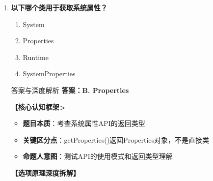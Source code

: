 \documentclass[12pt, a4paper]{ctexart}
\begin{document}
\begin{enumerate}[label=\textbf{\arabic*.}]
\begin{bluebox}{答案与深度解析}
		      \textbf{考场秒杀}：看到"不能实现接口"→选错误（枚举可以）
		      \textbf{高频陷阱}：
		      \begin{itemize}[label={}, nosep]
			      \item 枚举能实现接口，但不能继承类
			      \item 枚举构造器必须是private
			      \item 枚举实例是单例常量
		      \end{itemize}
		      \textbf{记忆口诀}：枚举就像类，能接口不能承，构造器必私有，成员是常量
	      \end{bluebox}

	      \vspace{1em}

	\item \textbf{以下哪个类用于获取系统属性？}
	      \begin{enumerate}[label=\Alph*.]
		      \item System
		      \item Properties
		      \item Runtime
		      \item SystemProperties
	      \end{enumerate}

	      \begin{bluebox}{答案与深度解析}
		      \textbf{答案：B. Properties}

		      \textbf{【核心认知框架>}
		      \begin{itemize}[label={}, leftmargin=*, nosep]
			      \item \textbf{题目本质}：考查系统属性API的返回类型
			      \item \textbf{关键区分点}：getProperties()返回Properties对象，不是直接类
			      \item \textbf{命题人意图}：测试API的使用模式和返回类型理解
		      \end{itemize}

		      \textbf{【选项原理深度拆解】}


\end{bluebox}
\end{enumerate}
\end{document}
